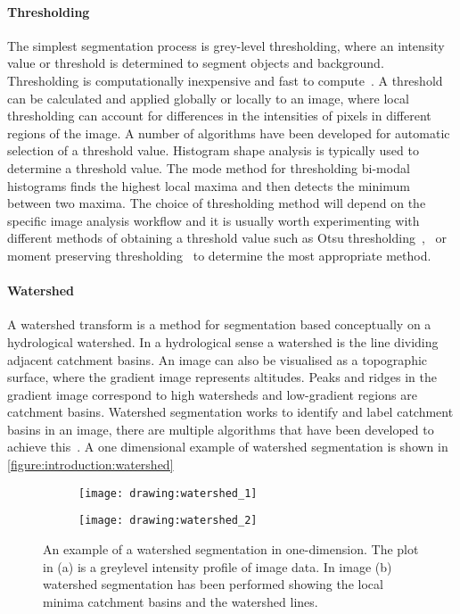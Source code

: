 \paragraph{Thresholding} The simplest segmentation process is grey-level thresholding, where an intensity value or threshold is determined to segment objects and background. Thresholding is computationally inexpensive and fast to compute~\cite{Sonka2007}. A threshold can be calculated and applied globally or locally to an image, where local thresholding can account for differences in the intensities of pixels in different regions of the image. A number of algorithms have been developed for automatic selection of a threshold value. Histogram shape analysis is typically used to determine a threshold value. The mode method for thresholding bi-modal histograms finds the highest local maxima and then detects the minimum between two maxima. The choice of thresholding method will depend on the specific image analysis workflow and it is usually worth experimenting with different methods of obtaining a threshold value such as Otsu thresholding~\cite{Otsu1979},~\cite{Kittler1986} or moment preserving thresholding~\cite{Tsai1985} to determine the most appropriate method.

\paragraph{Watershed} A watershed transform is a method for segmentation based conceptually on a hydrological watershed. In a hydrological sense a watershed is the line dividing adjacent catchment basins. An image can also be visualised as a topographic surface, where the gradient image represents altitudes. Peaks and ridges in the gradient image correspond to high watersheds and low-gradient regions are catchment basins. Watershed segmentation works to identify and label catchment basins in an image, there are multiple algorithms that have been developed to achieve this~\cite{Roerdink2000}. A one dimensional example of watershed segmentation is shown in \autoref{figure:introduction:watershed}

\begin{figure}[htbp!]\centering
	\begin{subfigure}[b]{0.48\linewidth}
		\centering
		\texttt{[image: drawing:watershed\_1]}
		\caption{}
		\label{figure:introduction:watershed_1}
	\end{subfigure}
	\begin{subfigure}[b]{0.48\linewidth}
		\centering
		\texttt{[image: drawing:watershed\_2]}
		\caption{}
		\label{figure:introduction:watershed_2}
	\end{subfigure}
\caption[Watershed transform 1D]{An example of a watershed segmentation in one-dimension. The plot in (a) is a greylevel intensity profile of image data. In image (b) watershed segmentation has been performed showing the local minima catchment basins and the watershed lines.}
\label{figure:introduction:watershed}
\end{figure}


